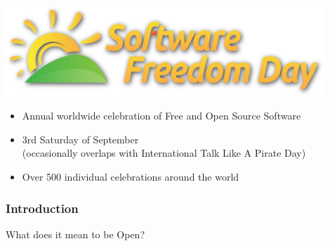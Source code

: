 \documentclass{beamer}
\begin{document}
\begin{frame}
  \vspace{-1em}
  \begin{center} \includegraphics[width=0.9\textwidth]{img/sfd} \end{center}
  \begin{large}
    \begin{itemize}
    \item Annual worldwide celebration of Free and Open Source
      Software
    \item 3rd Saturday of September \\ (occasionally overlaps with
      International Talk Like A Pirate Day)
    \item Over 500 individual celebrations around the world
    \end{itemize}
  \end{large}

\end{frame}

\begin{frame}
  \frametitle{Introduction}
  \begin{center}\begin{LARGE}What does it mean to be Open?\end{LARGE}\end{center}
\end{frame}
\end{document}
